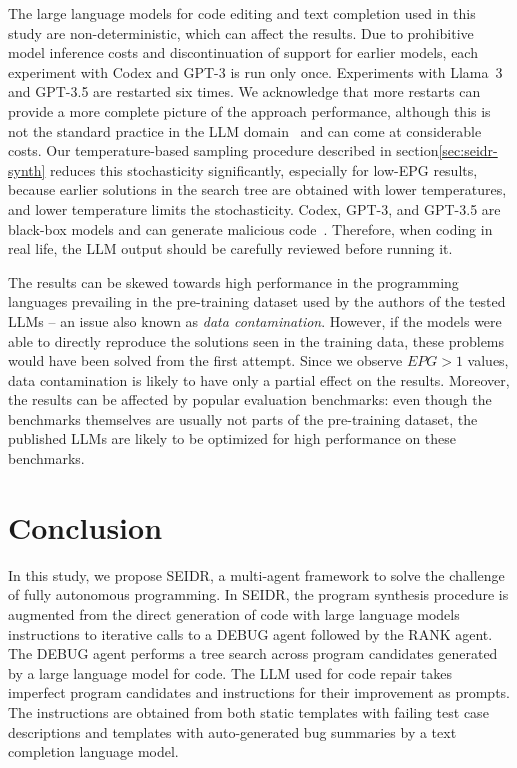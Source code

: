 The large language models for code editing and text completion used in this study are non-deterministic, 
which can affect the results. 
Due to prohibitive model inference costs and discontinuation of support for earlier models, each experiment with Codex and GPT-3 is run only once. 
Experiments with Llama~3 and GPT-3.5 are restarted six times. 
We acknowledge that more restarts can provide a more complete picture of the approach performance,
although this is not the standard practice in the LLM domain~\cite{ouyangLLMBoxChocolates2023} 
and can come at considerable costs.
Our temperature-based sampling procedure described in section\ref{sec:seidr-synth} reduces this stochasticity significantly, especially for low-EPG results, because earlier solutions in the search tree are obtained with lower temperatures, and lower temperature limits the stochasticity.
Codex, GPT-3, and GPT-3.5 are black-box models and can generate malicious code~\cite{pearceAsleepKeyboardAssessing2022}. 
Therefore, when coding in real life, the LLM output should be carefully reviewed before running it.

The results can be skewed towards high performance in the programming languages prevailing in the pre-training dataset used by the authors of the tested LLMs -- an issue also known as \emph{data contamination}.
However, if the models were able to directly reproduce the solutions seen in the training data, 
these problems would have been solved from the first attempt.
Since we observe $EPG>1$ values, data contamination is likely to have only a partial effect on the results.
Moreover, the results can be affected by popular evaluation benchmarks: even though the benchmarks themselves are usually not parts of the pre-training dataset, the published LLMs are likely to be optimized for high performance on these benchmarks.   

\newpage\section{Conclusion}
\label{sec:seidr-conclusion}

In this study, we propose SEIDR, a multi-agent framework to solve the challenge of fully autonomous programming. 
In SEIDR, the program synthesis procedure is augmented from the direct generation of code with large language models instructions to iterative calls to a DEBUG agent followed by the RANK agent. 
The DEBUG agent performs a tree search across program candidates generated by a large language model for code.
The LLM used for code repair takes imperfect program candidates and instructions for their improvement as prompts. 
The instructions are obtained from both static templates with failing test case descriptions and templates with auto-generated bug summaries by a text completion language model. 

